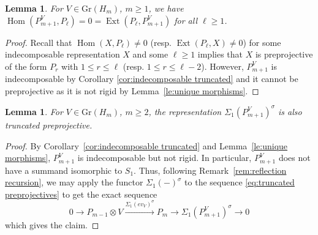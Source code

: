 \documentclass{amsart}
\newtheorem{lemma}[theorem]{Lemma}
\numberwithin{equation}{section}
\newcommand\udim{{\underline{\dim}\, }}
\newcommand{\Gr}{\mathrm{Gr}}
\newcommand{\Ext}{\operatorname{Ext}}
\newcommand{\Hom}{\operatorname{Hom}}
\begin{document}
\begin{lemma}
  \label{le:basic homological properties}
  For $V\in\Gr(H_m)$, $m\ge1$, we have $\Hom(P_{m+1}^V,P_\ell)=0=\Ext(P_\ell,P_{m+1}^V)$ for all $\ell\ge1$.
\end{lemma}
\begin{proof}
  Recall that $\Hom(X,P_\ell)\ne0$ (resp. $\Ext(P_\ell,X)\ne0$) for some indecomposable representation $X$ and some $\ell\ge1$ implies that $X$ is preprojective of the form $P_r$ with $1\le r\le\ell$ (resp. $1\le r\le\ell-2$).
  However, $P_{m+1}^V$ is indecomposable by Corollary \ref{cor:indecomposable truncated} and it cannot be preprojective as it is not rigid by Lemma~\ref{le:unique morphisms}.
\end{proof}

\begin{lemma}
  \label{le:reflected truncated preprojectives}
  For $V\in\Gr(H_m)$, $m\ge2$, the representation $\Sigma_1(P_{m+1}^V)^\sigma$ is also truncated preprojective.
\end{lemma}
\begin{proof}
  By Corollary~\ref{cor:indecomposable truncated} and Lemma~\ref{le:unique morphisms}, $P_{m+1}^V$ is indecomposable but not rigid.
  In particular, $P_{m+1}^V$ does not have a summand isomorphic to $S_1$.
  Thus, following Remark~\ref{rem:reflection recursion}, we may apply the functor $\Sigma_1(-)^\sigma$ to the sequence \eqref{eq:truncated preprojectives} to get the exact sequence
  \[0\longrightarrow P_{m-1}\otimes V\xrightarrow{\Sigma_1(ev_V)^\sigma} P_m\longrightarrow \Sigma_1(P_{m+1}^V)^\sigma\longrightarrow 0\]
  which gives the claim.
\end{proof}
\end{document}
